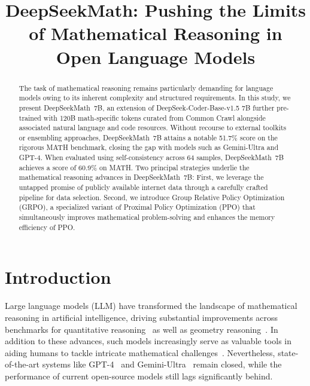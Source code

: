 \title{DeepSeekMath: Pushing the Limits of Mathematical Reasoning in Open Language Models}

\begin{abstract}
The task of mathematical reasoning remains particularly demanding for language models owing to its inherent complexity and structured requirements. In this study, we present DeepSeekMath~7B, an extension of DeepSeek-Coder-Base-v1.5 7B further pre-trained with 120B math-specific tokens curated from Common Crawl alongside associated natural language and code resources. Without recourse to external toolkits or ensembling approaches, DeepSeekMath~7B attains a notable 51.7\% score on the rigorous MATH benchmark, closing the gap with models such as Gemini-Ultra and GPT-4. When evaluated using self-consistency across 64 samples, DeepSeekMath~7B achieves a score of 60.9\% on MATH. Two principal strategies underlie the mathematical reasoning advances in DeepSeekMath~7B: First, we leverage the untapped promise of publicly available internet data through a carefully crafted pipeline for data selection. Second, we introduce Group Relative Policy Optimization (GRPO), a specialized variant of Proximal Policy Optimization (PPO) that simultaneously improves mathematical problem-solving and enhances the memory efficiency of PPO.
\end{abstract}

\section{Introduction}

Large language models (LLM) have transformed the landscape of mathematical reasoning in artificial intelligence, driving substantial improvements across benchmarks for quantitative reasoning~\citep{MATH} as well as geometry reasoning~\citep{trinh2024solving}. In addition to these advances, such models increasingly serve as valuable tools in aiding humans to tackle intricate mathematical challenges~\citep{tao}. Nevertheless, state-of-the-art systems like GPT-4~\citep{gpt4} and Gemini-Ultra~\citep{gemini} remain closed, while the performance of current open-source models still lags significantly behind.

